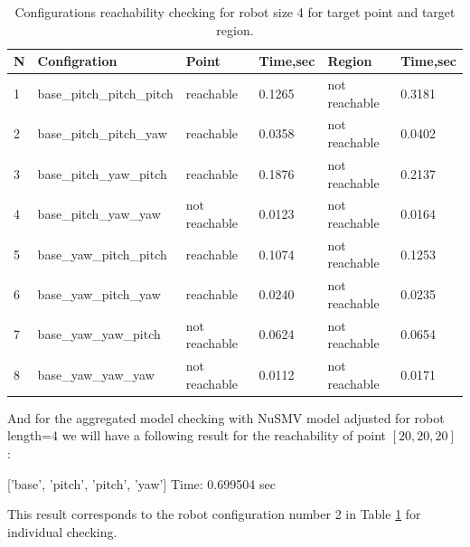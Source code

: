 
\begin{table}[h!]
\begin{tabular}{|l|l|l|l|l|l|}
\hline
N  & Configration                           & Point  & Time,sec   & Region  & Time,sec    \\ \hline
1 & base\_pitch\_pitch\_pitch & reachable      & 0.1265   &  not reachable   & 0.3181  \\ \hline
2 & base\_pitch\_pitch\_yaw   & reachable      & 0.0358   &  not reachable   & 0.0402  \\ \hline
3 & base\_pitch\_yaw\_pitch   & reachable      & 0.1876   &  not reachable   & 0.2137  \\ \hline
4 & base\_pitch\_yaw\_yaw     & not reachable  & 0.0123   &  not reachable   & 0.0164  \\ \hline
5 & base\_yaw\_pitch\_pitch   & reachable      & 0.1074   &  not reachable   & 0.1253  \\ \hline
6 & base\_yaw\_pitch\_yaw     & reachable      & 0.0240   &  not reachable   & 0.0235  \\ \hline
7 & base\_yaw\_yaw\_pitch     & not reachable  & 0.0624   &  not reachable   & 0.0654  \\ \hline
8 & base\_yaw\_yaw\_yaw       & not reachable  & 0.0112   &  not reachable   & 0.0171  \\ \hline
\end{tabular}
\caption{Configurations reachability checking for robot size 4 for target point and target region.}
\label{tab:conf4individ}
\end{table}

And for the aggregated model checking with NuSMV model adjusted for robot length=4 we will 
have a following result for the reachability of point $[20,20,20]$ :

['base', 'pitch', 'pitch', 'yaw']
Time: 0.699504 sec

This result corresponds to the robot configuration number 2 in Table \ref{tab:conf4individ}
for individual checking.


